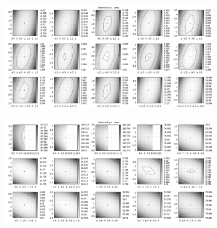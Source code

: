 \begin{figure}[!h]
\begin{subfigure}[t]{0.45\textwidth}
	 \end{subfigure}
\\
\vspace{5mm}
     \begin{subfigure}[t]{0.45\textwidth}
			\centering
			\includegraphics[width=\textwidth]{img/fitness/xz_a0zoomed.png}
	 \end{subfigure}
	 \qquad
     \begin{subfigure}[t]{0.45\textwidth}
			\centering
			\includegraphics[width=\textwidth]{img/fitness/yz_a0zoomed.png}
	 \end{subfigure}      
\end{figure}
%
